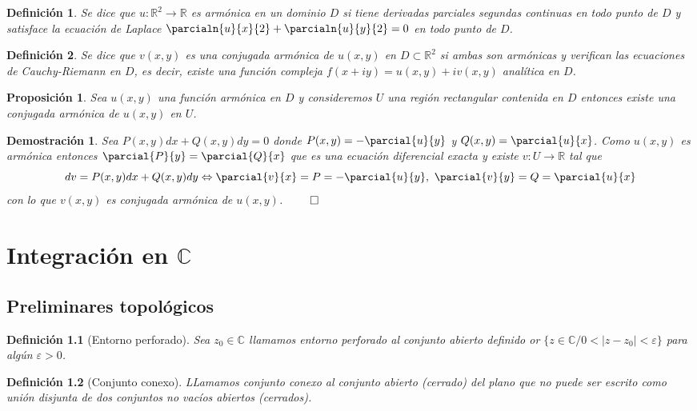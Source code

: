 \documentclass[10pt]{book}
\newtheorem{defi}{Definición}[chapter]
\newtheorem{prop}{Proposición}[chapter]
\newtheorem*{dem}{Demostración}
\newcommand{\R}{\mathbb{R}}
\newcommand{\C}{\mathbb{C}}
\begin{document}
\begin{defi}
Se dice que $u: \R^2 \longrightarrow \R$ es armónica en un dominio $D$ si tiene derivadas parciales segundas continuas en todo punto de $D$ y satisface la ecuación de Laplace $\displaystyle \parcialn{u}{x}{2} +  \parcialn{u}{y}{2} =0$ en todo punto de $D$.
\end{defi}

\begin{defi}
Se dice que $v(x,y)$ es una conjugada armónica de $u(x,y)$ en $D\subset\R^2$ si ambas son armónicas y verifican las ecuaciones de Cauchy-Riemann en $D$, es decir, existe una función compleja $f(x+iy) = u(x,y)+iv(x,y)$ analítica en $D$.
\end{defi}

\begin{prop}
Sea $u(x,y)$ una función armónica en $D$ y consideremos $U$ una región rectangular contenida en $D$ entonces existe una conjugada armónica de $u(x,y)$ en  $U$.
\end{prop}

\begin{dem}
Sea $P(x,y)dx + Q(x,y)dy =0$ donde $P(x,y)= -\parcial{u}{y}$ y $Q(x,y)= \parcial{u}{x}$. Como $u(x,y)$ es armónica entonces $\parcial{P}{y} = \parcial{Q}{x}$ que es una ecuación diferencial exacta y existe $v: U \longrightarrow \R$ tal que 
$$dv = P(x,y)dx + Q(x,y)dy \Leftrightarrow \parcial{v}{x} = P = -\parcial{u}{y},\ \parcial{v}{y} = Q = \parcial{u}{x}$$
con lo que $v(x,y)$ es conjugada armónica de $u(x,y)$. $\qed$
\end{dem}
\chapter{Integración en $\C$}
\section{Preliminares topológicos}

\begin{defi}[Entorno perforado]
Sea $z_0 \in\C$ llamamos entorno perforado al conjunto abierto definido or $\{z\in\C / 0 < |z-z_0|<\varepsilon\}$ para algún $\varepsilon>0$.
\end{defi}

\begin{defi}[Conjunto conexo]
LLamamos conjunto conexo al conjunto abierto (cerrado) del plano  que no puede ser escrito como unión disjunta de dos conjuntos no vacíos abiertos (cerrados).
\end{defi}
\end{document}
